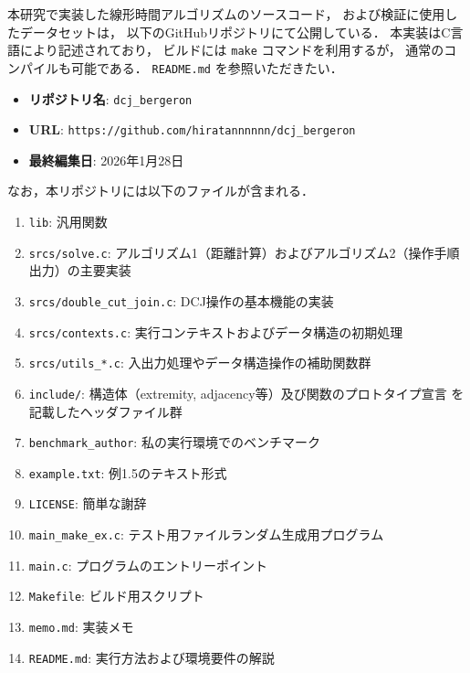 \documentclass[paper=a4,fontsize=11pt,report,oneside]{jlreq}
\begin{document}
本研究で実装した線形時間アルゴリズムのソースコード，
および検証に使用したデータセットは，
以下のGitHubリポジトリにて公開している．
本実装はC言語により記述されており，
ビルドには \texttt{make} コマンドを利用するが，
通常のコンパイルも可能である．
 \texttt{README.md} を参照いただきたい．

\vspace{1em}

\begin{itemize}
    \item \textbf{リポジトリ名}: \texttt{dcj\_bergeron}
    \item \textbf{URL}: \texttt{https://github.com/hiratannnnnn/dcj\_bergeron}
    \item \textbf{最終編集日}: 2026年1月28日
\end{itemize}

\vspace{1em}

なお，本リポジトリには以下のファイルが含まれる．

\begin{enumerate}
    \item \texttt{lib}: 汎用関数
    \item \texttt{srcs/solve.c}: アルゴリズム1（距離計算）およびアルゴリズム2（操作手順出力）の主要実装
    \item \texttt{srcs/double\_cut\_join.c}: DCJ操作の基本機能の実装
    \item \texttt{srcs/contexts.c}: 実行コンテキストおよびデータ構造の初期処理
    \item \texttt{srcs/utils\_*.c}: 入出力処理やデータ構造操作の補助関数群
    \item \texttt{include/}: 構造体（extremity, adjacency等）及び関数のプロトタイプ宣言
                            を記載したヘッダファイル群
    \item \texttt{benchmark\_author}: 私の実行環境でのベンチマーク
    \item \texttt{example.txt}: 例1.5のテキスト形式
    \item \texttt{LICENSE}: 簡単な謝辞
    \item \texttt{main\_make\_ex.c}: テスト用ファイルランダム生成用プログラム
    \item \texttt{main.c}: プログラムのエントリーポイント
    \item \texttt{Makefile}: ビルド用スクリプト
    \item \texttt{memo.md}: 実装メモ
    \item \texttt{README.md}: 実行方法および環境要件の解説
\end{enumerate}
\end{document}
